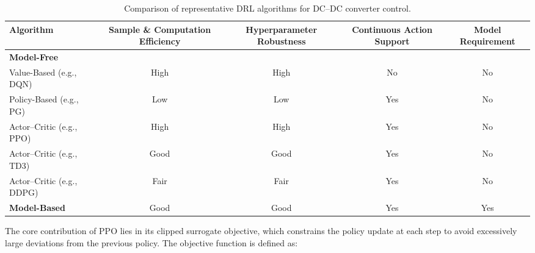 \documentclass[conference]{IEEEtran}
\begin{document}
\begin{table}[t]
\centering
\caption{Comparison of representative DRL algorithms for DC--DC converter control.}
\label{tab:DRLcompare}
\begin{tabular}{lcccc}
\hline\hline
\textbf{Algorithm} & 
\textbf{Sample \& Computation Efficiency} & 
\textbf{Hyperparameter Robustness} & 
\textbf{Continuous Action Support} & 
\textbf{Model Requirement} \\
\hline
\textbf{Model-Free} &  &   &   &   \\
Value-Based (e.g., DQN)         & High     & High     & No      & No \\
Policy-Based (e.g., PG)         & Low      & Low      & Yes     & No \\
Actor--Critic (e.g., PPO)       & High & High & Yes     & No \\
Actor--Critic (e.g., TD3)       & Good     & Good     & Yes     & No \\
Actor--Critic (e.g., DDPG)      & Fair     & Fair     & Yes     & No \\
\hline
\textbf{Model-Based}     & Good     & Good     & Yes     & Yes \\
\hline
\end{tabular}

\end{table}




The core contribution of PPO lies in its clipped surrogate objective, which constrains the policy update at each step to avoid excessively large deviations from the previous policy. The objective function is defined as:
\end{document}
